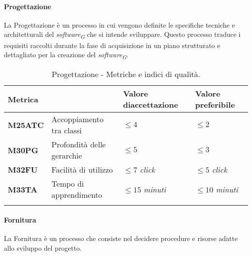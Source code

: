\vspace{0.5cm}

\paragraph{Progettazione}
La Progettazione è un processo in cui vengono definite le specifiche tecniche e architetturali del \textit{software}\textsubscript{\textit{G}} che si intende sviluppare. Questo processo traduce i requisiti raccolti durante la fase di acquisizione in un piano strutturato e dettagliato per la creazione del \textit{software}\textsubscript{\textit{G}}.

\vspace{0.4cm}

\begin{longtable}{|C{1.9cm}|L{4cm}|L{2.2cm}|L{2.1cm}|}
    \hline
    \textbf{Metrica} &  & \textbf{Valore di\linebreak accettazione} & {\textbf{Valore \linebreak preferibile}} \\
    \hline \hline

    \textbf{M25ATC} & Accoppiamento tra classi & $\leq 4$  & $\leq 2$ \\
    \hline

    \textbf{M30PG} & Profondità delle gerarchie & $\leq 5$  & $\leq 3$ \\
    \hline

    \textbf{M32FU} & Facilità di utilizzo & $\leq 7$ \textit{click}  & $\leq 5$ \textit{click} \\
    \hline

    \textbf{M33TA} & Tempo di apprendimento & $\leq 15$ \textit{minuti}  & $\leq 10$ \textit{minuti} \\
    \hline

    \caption{Progettazione - Metriche e indici di qualità.}
    \label{tab:progettazione_progetto}
\end{longtable}

\pagebreak

\paragraph{Fornitura}
La Fornitura è un processo che consiste nel decidere procedure e risorse adatte allo sviluppo del progetto.

